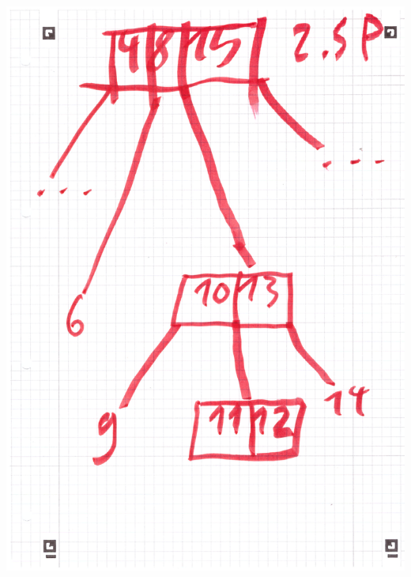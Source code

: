\documentclass{article}
\begin{document}
	\includegraphics[width=\linewidth]{A30202}
\end{document}
